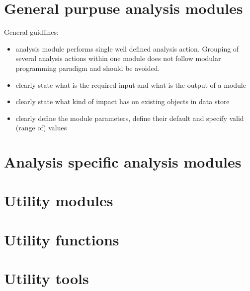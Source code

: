 \documentclass[a4paper,11pt]{article}
\begin{document}






\newpage
\section{General purpuse analysis modules}

General guidlines:
\begin{itemize}
 \item analysis module performs single well defined analysis action. Grouping of several analysis actions within one 
 module does not follow modular programming paradigm and should be avoided.
 \item clearly state what is the required input and what is the output of a module
 \item clearly state what kind of impact has on existing objects in data store
 \item clearly define the module parameters, define their default and specify valid (range of) values
\end{itemize}








\section{Analysis specific analysis modules}

\section{Utility modules}


\section{Utility functions}

\section{Utility tools}



\end{document}
